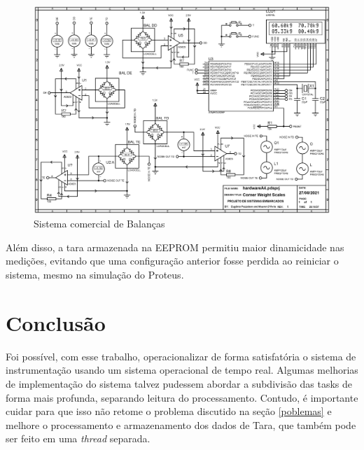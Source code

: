 \documentclass[a4paper, 12pt]{article}
\begin{document}
	\begin{figure}[!htb]
		\centering
		\includegraphics[width=.85\linewidth]{simulacao}
		\caption{Sistema comercial de Balanças}
		\label{fig:simulacao}
	\end{figure}

	Além disso, a tara armazenada na EEPROM permitiu maior dinamicidade nas medições, evitando que uma configuração anterior fosse perdida ao reiniciar o sistema, mesmo na simulação do Proteus.  
	
	\section{Conclusão}
	Foi possível, com esse trabalho, operacionalizar de forma satisfatória o sistema de instrumentação usando um sistema operacional de tempo real. Algumas melhorias de implementação do sistema talvez pudessem abordar a subdivisão das tasks de forma mais profunda, separando leitura do processamento. Contudo, é importante cuidar para que isso não retome o problema discutido na seção \ref{poblemas} e melhore o processamento e armazenamento dos dados de Tara, que também pode ser feito em uma \textit{thread} separada. 
	
	
\end{document}
